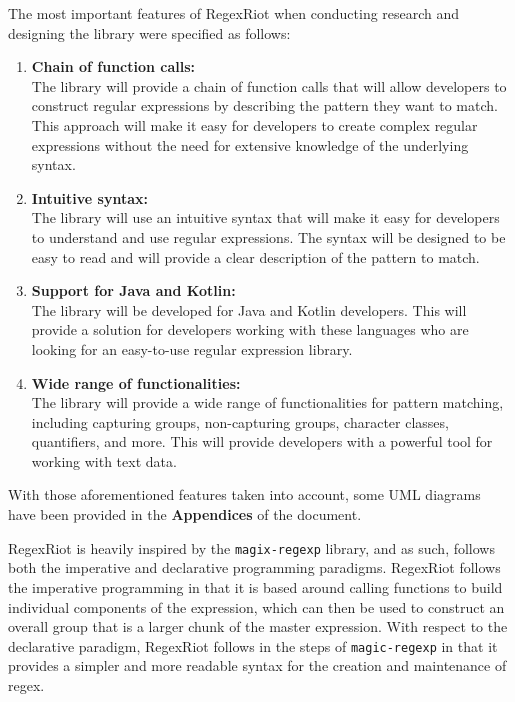 \documentclass[conference]{IEEEtran}
\begin{document}
The most important features of RegexRiot when conducting research and
designing the library were specified as follows:

\begin{enumerate}
    \item \textbf{Chain of function calls:}\\
          The library will provide a chain of function calls that will allow developers
          to construct regular expressions by describing the pattern they want to match.
          This approach will make it easy for developers to create complex regular expressions
          without the need for extensive knowledge of the underlying syntax.

    \item \textbf{Intuitive syntax:}\\
          The library will use an intuitive syntax that will make it easy for developers
          to understand and use regular expressions. The syntax will be designed to be easy
          to read and will provide a clear description of the pattern to match.

    \item \textbf{Support for Java and Kotlin:}\\
          The library will be developed for Java and Kotlin developers. \cite{oracledocs93}
          This will provide a solution for developers working with these languages who are
          looking for an easy-to-use regular expression library.\cite{kotlindocs23}

          \vfill\eject

    \item \textbf{Wide range of functionalities:}\\
          The library will provide a wide range of functionalities for pattern matching,
          including capturing groups, non-capturing groups, character classes, quantifiers,
          and more. This will provide developers with a powerful tool for working with text data.
\end{enumerate}

With those aforementioned features taken into account,
some UML diagrams have been provided in the \textbf{Appendices} of the
document.

RegexRiot is heavily inspired by the \texttt{magix-regexp} library, and as such,
follows both the imperative and declarative programming paradigms. \cite{magic-regexp}
RegexRiot follows the imperative programming in that it is based around calling functions
to build individual components of the expression, which can then be used to construct an
overall group that is a larger chunk of the master expression. With respect to the
declarative paradigm, RegexRiot follows in the steps of \texttt{magic-regexp}
in that it provides a simpler and more readable syntax for the creation and
maintenance of regex.
\end{document}
